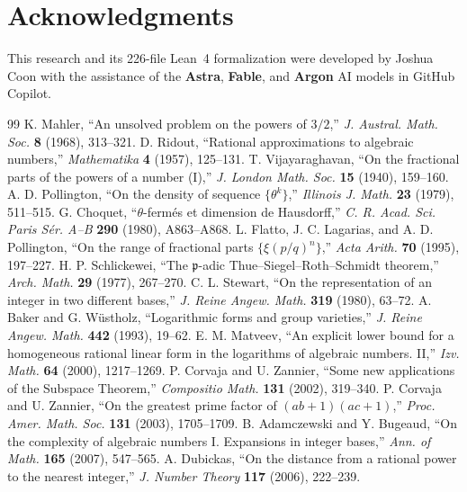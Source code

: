 \documentclass[11pt]{article}
\begin{document}
\begin{enumerate}
\end{enumerate}

\section*{Acknowledgments}
This research and its 226-file Lean~4 formalization were developed by Joshua Coon with the assistance of the \textbf{Astra}, \textbf{Fable}, and \textbf{Argon} AI models in GitHub Copilot.

\begin{thebibliography}{99}
 K. Mahler, ``An unsolved problem on the powers of $3/2$,'' \emph{J. Austral. Math. Soc.} \textbf{8} (1968), 313--321.
 D. Ridout, ``Rational approximations to algebraic numbers,'' \emph{Mathematika} \textbf{4} (1957), 125--131.
 T. Vijayaraghavan, ``On the fractional parts of the powers of a number (I),'' \emph{J. London Math. Soc.} \textbf{15} (1940), 159--160.
 A. D. Pollington, ``On the density of sequence $\{\theta^k\}$,'' \emph{Illinois J. Math.} \textbf{23} (1979), 511--515.
 G. Choquet, ``$\theta$-ferm\'es et dimension de Hausdorff,'' \emph{C. R. Acad. Sci. Paris S\'er. A--B} \textbf{290} (1980), A863--A868.
 L. Flatto, J. C. Lagarias, and A. D. Pollington, ``On the range of fractional parts $\{\xi (p/q)^n\}$,'' \emph{Acta Arith.} \textbf{70} (1995), 197--227.
 H. P. Schlickewei, ``The $\mathfrak{p}$-adic Thue--Siegel--Roth--Schmidt theorem,'' \emph{Arch. Math.} \textbf{29} (1977), 267--270.
 C. L. Stewart, ``On the representation of an integer in two different bases,'' \emph{J. Reine Angew. Math.} \textbf{319} (1980), 63--72.
 A. Baker and G. W\"ustholz, ``Logarithmic forms and group varieties,'' \emph{J. Reine Angew. Math.} \textbf{442} (1993), 19--62.
 E. M. Matveev, ``An explicit lower bound for a homogeneous rational linear form in the logarithms of algebraic numbers. II,'' \emph{Izv. Math.} \textbf{64} (2000), 1217--1269.
 P. Corvaja and U. Zannier, ``Some new applications of the Subspace Theorem,'' \emph{Compositio Math.} \textbf{131} (2002), 319--340.
 P. Corvaja and U. Zannier, ``On the greatest prime factor of $(ab+1)(ac+1)$,'' \emph{Proc. Amer. Math. Soc.} \textbf{131} (2003), 1705--1709.
 B. Adamczewski and Y. Bugeaud, ``On the complexity of algebraic numbers I. Expansions in integer bases,'' \emph{Ann. of Math.} \textbf{165} (2007), 547--565.
 A. Dubickas, ``On the distance from a rational power to the nearest integer,'' \emph{J. Number Theory} \textbf{117} (2006), 222--239.

\end{thebibliography}
\end{document}
